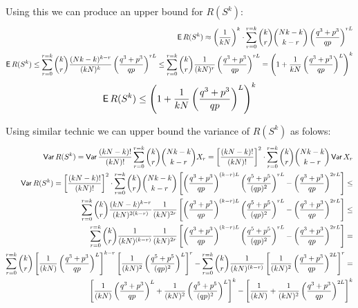 \documentclass[11pt]{article}
\begin{document}
Using this we can produce an upper bound for $R(S^k)$:
\begin{align*}
\operatorname{\mathsf{E}} R(S^k) \approx \left ( \frac{1} { kN} \right )^k  \cdot \sum_{r=0}^{r=k} \binom{k}{r} \binom{Nk-k}{k-r} \left ( \frac{q^3 + p^3} {qp} \right )^{rL} \\
\operatorname{\mathsf{E}} R(S^k)  \le  \sum_{r=0}^{r=k} \binom{k}{r} \frac{ (Nk-k)^{k-r} }{ (kN)^k} \left ( \frac{q^3 + p^3} {qp} \right )^{rL}  \le  \sum_{r=0}^{r=k} \binom{k}{r} \frac{ 1 }{ (kN)^r} \left ( \frac{q^3 + p^3} {qp} \right )^{rL} = \left ( 1 +  \frac{ 1 }{kN} \left ( \frac{q^3 + p^3} {qp} \right )^{L} \right )^k
\end{align*}
\begin{align}
\operatorname{\mathsf{E}} R(S^k)  \le  \left ( 1 +  \frac{ 1 }{kN} \left ( \frac{q^3 + p^3} {qp} \right )^{L} \right )^k
\end{align}

Using similar technic we can upper bound the variance of $R(S^k)$ as folows:
\begin{align*}
\operatorname{\mathsf{Var}} R(S^k) =  \operatorname{\mathsf{Var}} \frac{ (kN-k)! }{(kN)!}   \sum_{r=0}^{r=k} \binom{k}{r} \binom{Nk-k}{k-r} X_r = \left [ \frac{ (kN-k)! }{(kN)!}  \right ]^2  \cdot \sum_{r=0}^{r=k} \binom{k}{r} \binom{Nk-k}{k-r} \operatorname{\mathsf{Var}} X_r \\
\operatorname{\mathsf{Var}} R(S^k) =   \left [ \frac{ (kN-k)! }{(kN)!}  \right ]^2  \cdot \sum_{r=0}^{r=k} \binom{k}{r} \binom{Nk-k}{k-r} \left [   \left ( \frac{q^3 + p^3} {qp} \right )^{(k-r)L} \left ( \frac{q^5 + p^5} {(qp)^2} \right )^{rL}  - \left ( \frac{q^3 + p^3} {qp} \right )^{2rL}  \right ] \le \\
\sum_{r=0}^{r=k} \binom{k}{r} \frac{(kN-k)^{k-r}}  {(kN)^{2(k-r)}}  \frac{1} {(kN)^{2r}} \left [  \left ( \frac{q^3 + p^3} {qp} \right )^{(k-r)L} \left ( \frac{q^5 + p^5} {(qp)^2} \right )^{rL}  - \left ( \frac{q^3 + p^3} {qp} \right )^{2rL}  \right ] \le \\
\sum_{r=0}^{r=k} \binom{k}{r} \frac{1}  {(kN)^{(k-r)}}  \frac{1} {(kN)^{2r}} \left [  \left ( \frac{q^3 + p^3} {qp} \right )^{(k-r)L} \left ( \frac{q^5 + p^5} {(qp)^2} \right )^{rL}  - \left ( \frac{q^3 + p^3} {qp} \right )^{2rL}  \right ]  = \\
\sum_{r=0}^{r=k} \binom{k}{r} \left [ \frac{1}  {(kN)} \left ( \frac{q^3 + p^3} {qp} \right )^L \right ]^{k-r}   \left [   \frac{1} {(kN)^{2}}  \left ( \frac{q^5 + p^5} {(qp)^2} \right )^{L}  \right ]^r     - \sum_{r=0}^{r=k} \binom{k}{r}  \frac{1}  {(kN)^{(k-r)}} \left [   \frac{1} {(kN)^{2}}  \left ( \frac{q^3 + p^3} {qp} \right )^{2L}  \right ]^r = \\
\left [  \frac{1}  {(kN)} \left ( \frac{q^3 + p^3} {qp} \right )^L +   \frac{1} {(kN)^{2}}  \left ( \frac{q^5 + p^5} {(qp)^2} \right )^{L}  \right ]^k -  \left [  \frac{1}  {(kN)} +   \frac{1} {(kN)^{2}}  \left ( \frac{q^3 + p^3} {qp} \right )^{2L}  \right ]^k
\end{align*}
\end{document}
